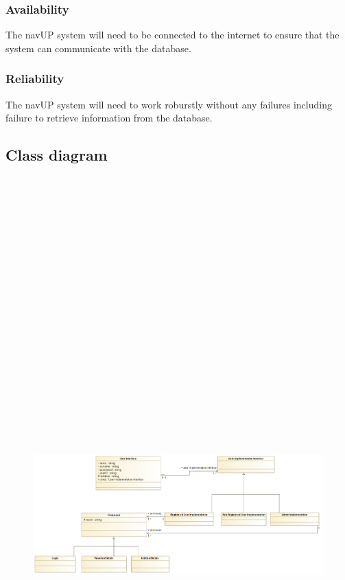 	\subsubsection{Availability}
	The navUP system will need to be connected to the internet to ensure that the system can communicate with  the database.
	\subsubsection{Reliability}
	The navUP system will need to work roburstly without any failures including failure to retrieve information from the database.

\subsection{Class diagram}
\begin{figure}[H]
	\includegraphics[width=12cm,height=26cm,keepaspectratio]{Users/Pictures/User_Class_Diagram.png}

\end{figure}

